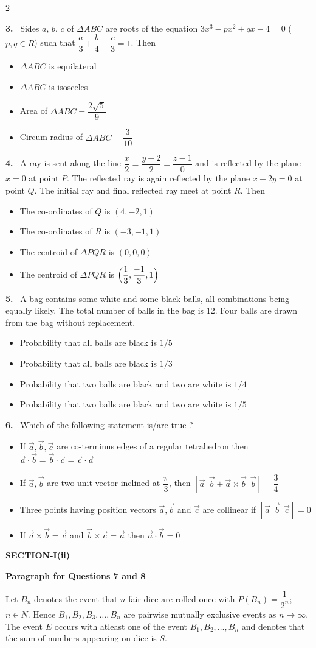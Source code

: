 \documentclass[10pt]{extarticle}
\newcommand{\sect}[1]{\par\smallskip\noindent\textbf{#1}\par}
\newcommand{\qn}[1]{\par\smallskip\noindent\textbf{#1.}~}
\newcommand{\paraq}[2]{\par\smallskip\noindent\textbf{Paragraph for Questions #1 and #2}\par}
\newenvironment{qoptions}{\begin{itemize}[leftmargin=1.8em,itemsep=1pt,topsep=2pt,label={}]}{\end{itemize}}
\newcommand{\opt}[2]{\item[(#1)] #2}
\begin{document}
\begin{multicols}{2}
\qn{3} Sides $a$, $b$, $c$ of $\Delta ABC$ are roots of the equation $3x^3-px^2+qx-4=0$ ($p,q\in R$) such that $\dfrac a3+\dfrac b4+\dfrac c3=1$. Then
\begin{qoptions}
\opt{A}{$\Delta ABC$ is equilateral}
\opt{B}{$\Delta ABC$ is isosceles}
\opt{C}{Area of $\Delta ABC=\dfrac{2\sqrt5}9$}
\opt{D}{Circum radius of $\Delta ABC=\dfrac3{10}$}
\end{qoptions}
\qn{4} A ray is sent along the line $\dfrac x2=\dfrac{y-2}2=\dfrac{z-1}0$ and is reflected by the plane $x=0$ at point $P$. The reflected ray is again reflected by the plane $x+2y=0$ at point $Q$. The initial ray and final reflected ray meet at point $R$. Then
\begin{qoptions}
\opt{A}{The co-ordinates of $Q$ is $(4,-2,1)$}
\opt{B}{The co-ordinates of $R$ is $(-3,-1,1)$}
\opt{C}{The centroid of $\Delta PQR$ is $(0,0,0)$}
\opt{D}{The centroid of $\Delta PQR$ is $\Bigl(\dfrac13,\dfrac{-1}3,1\Bigr)$}
\end{qoptions}
\qn{5} A bag contains some white and some black balls, all combinations being equally likely. The total number of balls in the bag is 12. Four balls are drawn from the bag without replacement.
\begin{qoptions}
\opt{A}{Probability that all balls are black is $1/5$}
\opt{B}{Probability that all balls are black is $1/3$}
\opt{C}{Probability that two balls are black and two are white is $1/4$}
\opt{D}{Probability that two balls are black and two are white is $1/5$}
\end{qoptions}
\qn{6} Which of the following statement is/are true ?
\begin{qoptions}
\opt{A}{If $\vec a,\vec b,\vec c$ are co-terminus edges of a regular tetrahedron then $\vec a\cdot\vec b=\vec b\cdot\vec c=\vec c\cdot\vec a$}
\opt{B}{If $\vec a,\vec b$ are two unit vector inclined at $\dfrac\pi3$, then $[\vec a\ \ \vec b+\vec a\times\vec b\ \ \vec b]=\dfrac34$}
\opt{C}{Three points having position vectors $\vec a,\vec b$ and $\vec c$ are collinear if $[\vec a\ \ \vec b\ \ \vec c]=0$}
\opt{D}{If $\vec a\times\vec b=\vec c$ and $\vec b\times\vec c=\vec a$ then $\vec a\cdot\vec b=0$}
\end{qoptions}
\sect{SECTION-I(ii)}
\paraq{7}{8}
Let $B_n$ denotes the event that $n$ fair dice are rolled once with $P(B_n)=\dfrac1{2^n}$; $n\in N$. Hence $B_1,B_2,B_3,\ldots,B_n$ are pairwise mutually exclusive events as $n\to\infty$. The event $E$ occurs with atleast one of the event $B_1,B_2,\ldots,B_n$ and denotes that the sum of numbers appearing on dice is $S$.

\end{multicols}
\end{document}
